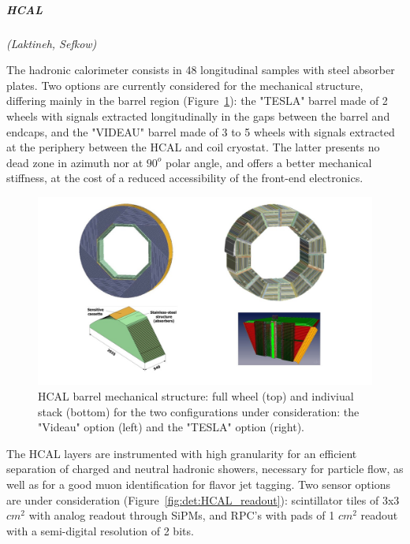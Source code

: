 \vspace{1cm}
\subparagraph*{\bf HCAL}
\textit{(Laktineh, Sefkow)}

The hadronic calorimeter consists in 48 longitudinal samples with steel absorber plates. Two options are currently considered for the mechanical structure, differing mainly in the barrel region (Figure~\ref{fig:det:HCAL}): the "TESLA" barrel made of 2 wheels with signals extracted longitudinally in the gaps between the barrel and endcaps, and the "VIDEAU" barrel made of 3 to 5 wheels with signals extracted at the periphery between the HCAL and coil cryostat. The latter presents no dead zone in azimuth nor at $90^o$ polar angle, and offers a better mechanical stiffness, at the cost of a reduced accessibility of the front-end electronics.

\begin{figure}[t!]
\centering
\includegraphics[width=1.1\hsize]{Detector/fig/HCAL_structure.jpg}
\caption{HCAL barrel mechanical structure: full wheel (top) and indiviual stack (bottom) for the two configurations under consideration: the "Videau" option (left) and the "TESLA" option (right).}
\label{fig:det:HCAL}
\end{figure}

The HCAL layers are instrumented with high granularity for an efficient separation of charged and neutral hadronic showers, necessary for particle flow, as well as for a good muon identification for flavor jet tagging. Two sensor options are under consideration (Figure~\ref{fig:det:HCAL_readout}): scintillator tiles of 3x3 $cm^2$ with analog readout through SiPMs, and RPC's with pads of 1 $cm^2$ readout with a semi-digital resolution of 2 bits.

